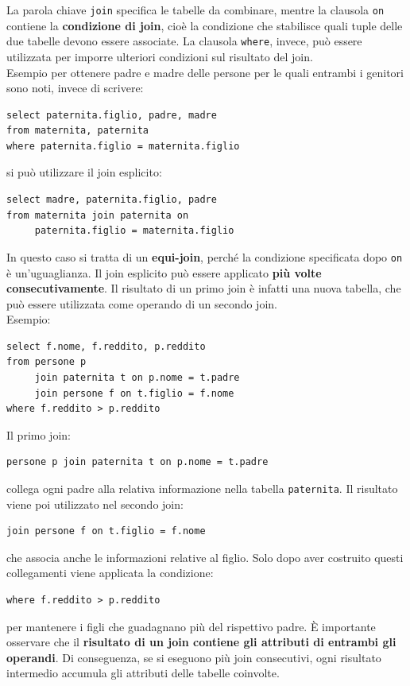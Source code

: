 \noindent La parola chiave \texttt{join} specifica le tabelle da combinare, mentre la clausola \texttt{on} contiene la \textbf{condizione di join}, cioè la condizione che stabilisce quali tuple delle due tabelle devono essere associate. La clausola \texttt{where}, invece, può essere utilizzata per imporre ulteriori condizioni sul risultato del join.\\
\textcolor{verdeEsempio}{Esempio} per ottenere padre e madre delle persone per le quali entrambi i genitori sono noti, invece di scrivere:
\begin{verbatim}
select paternita.figlio, padre, madre
from maternita, paternita
where paternita.figlio = maternita.figlio
\end{verbatim}
\noindent si può utilizzare il join esplicito:
\begin{verbatim}
select madre, paternita.figlio, padre
from maternita join paternita on
     paternita.figlio = maternita.figlio
\end{verbatim}
\noindent In questo caso si tratta di un \textbf{equi-join}, perché la condizione specificata dopo \texttt{on} è un'uguaglianza.
Il join esplicito può essere applicato \textbf{più volte consecutivamente}. Il risultato di un primo join è infatti una nuova tabella, che può essere utilizzata come operando di un secondo join.\\ 
\textcolor{verdeEsempio}{Esempio:}
\begin{verbatim}
select f.nome, f.reddito, p.reddito
from persone p
     join paternita t on p.nome = t.padre
     join persone f on t.figlio = f.nome
where f.reddito > p.reddito
\end{verbatim}
\noindent Il primo join:
\begin{verbatim}
persone p join paternita t on p.nome = t.padre
\end{verbatim}
\noindent collega ogni padre alla relativa informazione nella tabella \texttt{paternita}. Il risultato viene poi utilizzato nel secondo join:
\begin{verbatim}
join persone f on t.figlio = f.nome
\end{verbatim}
\noindent che associa anche le informazioni relative al figlio. Solo dopo aver costruito questi collegamenti viene applicata la condizione:
\begin{verbatim}
where f.reddito > p.reddito
\end{verbatim}
\noindent per mantenere i figli che guadagnano più del rispettivo padre.
È importante osservare che il \textbf{risultato di un join contiene gli attributi di entrambi gli operandi}. Di conseguenza, se si eseguono più join consecutivi, ogni risultato intermedio accumula gli attributi delle tabelle coinvolte.
